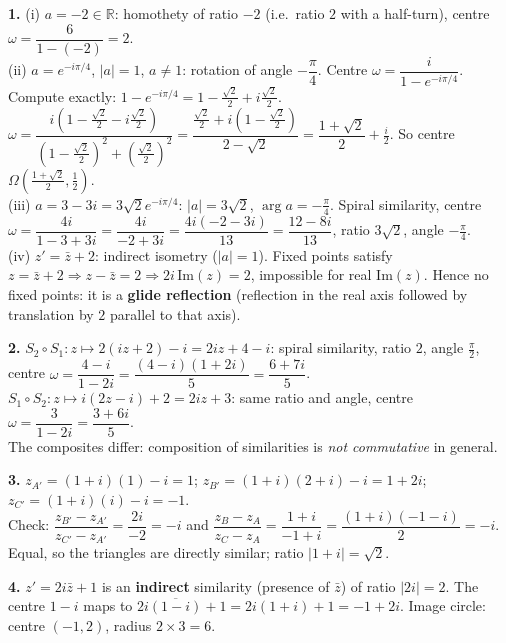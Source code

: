 \documentclass[11pt]{article}
\begin{document}
\begin{corrige}[Exercise 1]
\textbf{1.} (i) $a = -2 \in \mathbb{R}$: homothety of ratio $-2$ (i.e.\ ratio $2$ with a half-turn), centre $\omega = \dfrac{6}{1-(-2)} = 2$. \\
(ii) $a = e^{-i\pi/4}$, $|a|=1$, $a\neq 1$: rotation of angle $-\dfrac{\pi}{4}$. Centre $\omega = \dfrac{i}{1 - e^{-i\pi/4}}$. Compute exactly:
$1 - e^{-i\pi/4} = 1 - \frac{\sqrt2}{2} + i\frac{\sqrt2}{2}$.
$\omega = \dfrac{i\left(1 - \frac{\sqrt2}{2} - i\frac{\sqrt2}{2}\right)}{\left(1-\frac{\sqrt2}{2}\right)^2 + \left(\frac{\sqrt2}{2}\right)^2} = \dfrac{\frac{\sqrt2}{2} + i\left(1-\frac{\sqrt2}{2}\right)}{2-\sqrt2} = \dfrac{1+\sqrt2}{2} + \frac{i}{2}$.
So centre $\Omega\left(\frac{1+\sqrt2}{2}, \frac12\right)$. \\
(iii) $a = 3-3i = 3\sqrt2 e^{-i\pi/4}$: $|a| = 3\sqrt2$, $\arg a = -\frac{\pi}{4}$. Spiral similarity, centre $\omega = \dfrac{4i}{1 - 3 + 3i} = \dfrac{4i}{-2 + 3i} = \dfrac{4i(-2-3i)}{13} = \dfrac{12 - 8i}{13}$, ratio $3\sqrt2$, angle $-\frac{\pi}{4}$. \\
(iv) $z' = \bar z + 2$: indirect isometry ($|a|=1$). Fixed points satisfy $z = \bar z + 2 \Rightarrow z - \bar z = 2 \Rightarrow 2i\,\mathrm{Im}(z) = 2$, impossible for real $\mathrm{Im}(z)$. Hence no fixed points: it is a \textbf{glide reflection} (reflection in the real axis followed by translation by $2$ parallel to that axis).

\textbf{2.} $S_2 \circ S_1: z \mapsto 2(iz + 2) - i = 2iz + 4 - i$: spiral similarity, ratio $2$, angle $\tfrac{\pi}{2}$, centre $\omega = \dfrac{4 - i}{1 - 2i} = \dfrac{(4-i)(1+2i)}{5} = \dfrac{6 + 7i}{5}$. \\
$S_1 \circ S_2: z \mapsto i(2z - i) + 2 = 2iz + 3$: same ratio and angle, centre $\omega = \dfrac{3}{1 - 2i} = \dfrac{3 + 6i}{5}$. \\
The composites differ: composition of similarities is \emph{not commutative} in general.

\textbf{3.} $z_{A'} = (1+i)(1) - i = 1$; $z_{B'} = (1+i)(2+i) - i = 1 + 2i$; $z_{C'} = (1+i)(i) - i = -1$. \\
Check: $\dfrac{z_{B'} - z_{A'}}{z_{C'} - z_{A'}} = \dfrac{2i}{-2} = -i$ and $\dfrac{z_B - z_A}{z_C - z_A} = \dfrac{1 + i}{-1 + i} = \dfrac{(1+i)(-1-i)}{2} = -i$. Equal, so the triangles are directly similar; ratio $|1 + i| = \sqrt2$.

\textbf{4.} $z' = 2i\bar z + 1$ is an \textbf{indirect} similarity (presence of $\bar z$) of ratio $|2i| = 2$. The centre $1 - i$ maps to $2i\overline{(1 - i)} + 1 = 2i(1 + i) + 1 = -1 + 2i$. Image circle: centre $(-1, 2)$, radius $2 \times 3 = 6$.
\end{corrige}
\end{document}
